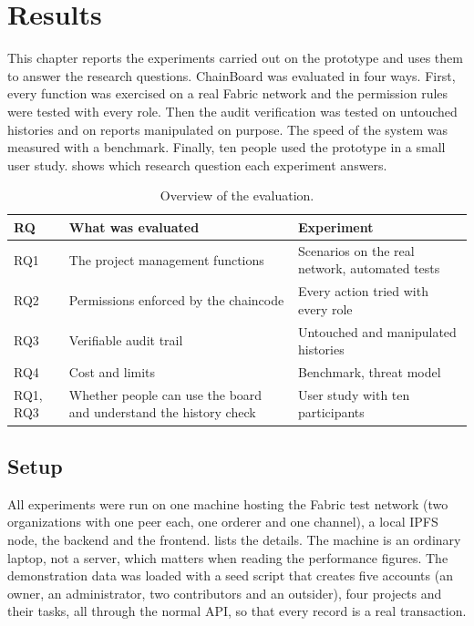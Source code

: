 \chapter{Results}
\label{ch:results}

This chapter reports the experiments carried out on the prototype and uses them to answer the research questions. ChainBoard was evaluated in four ways. First, every function was exercised on a real Fabric network and the permission rules were tested with every role. Then the audit verification was tested on untouched histories and on reports manipulated on purpose. The speed of the system was measured with a benchmark. Finally, ten people used the prototype in a small user study.  shows which research question each experiment answers.

\begin{table}[htbp]
    \centering
    \small
    \begin{tabular}{p{1.1cm}p{5.6cm}p{5.4cm}}
        \toprule
        RQ & What was evaluated & Experiment \\
        \midrule
        RQ1 & The project management functions & Scenarios on the real network, automated tests \\
        RQ2 & Permissions enforced by the chaincode & Every action tried with every role \\
        RQ3 & Verifiable audit trail & Untouched and manipulated histories \\
        RQ4 & Cost and limits & Benchmark, threat model \\
        RQ1, RQ3 & Whether people can use the board and understand the history check & User study with ten participants \\
        \bottomrule
    \end{tabular}
    \caption{Overview of the evaluation.}
    \label{tab:eval-overview}
\end{table}

\section{Setup}
\label{sec:results-setup}

All experiments were run on one machine hosting the Fabric test network (two organizations with one peer each, one orderer and one channel), a local IPFS node, the backend and the frontend.  lists the details. The machine is an ordinary laptop, not a server, which matters when reading the performance figures. The demonstration data was loaded with a seed script that creates five accounts (an owner, an administrator, two contributors and an outsider), four projects and their tasks, all through the normal API, so that every record is a real transaction.

